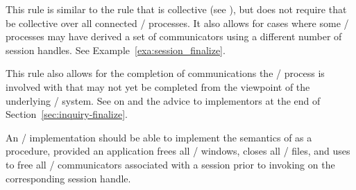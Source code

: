 \begin{rationale}
This rule is similar to the rule that  is collective (see ),
but does not require that  be collective over all connected \MPI/ processes.
It also allows for cases where some \MPI/ processes may have derived a set of communicators
using a different number of session handles.  See Example~\ref{exa:session_finalize}.
\end{rationale}

\begin{implementors}
This rule also allows for the completion of communications the \MPI/ process is involved with
that may not yet be completed from the viewpoint of the underlying \MPI/ system.
See  on 
and the advice to implementors at the end of Section~\ref{sec:inquiry-finalize}.
\end{implementors}

\begin{implementors}
An \MPI/ implementation should be able to implement the semantics of 
as a  procedure,
provided an application frees all \MPI/ windows, closes all \MPI/ files,
and uses  to free all \MPI/ communicators
associated with a session
prior to invoking  on the corresponding session handle.
\end{implementors}


